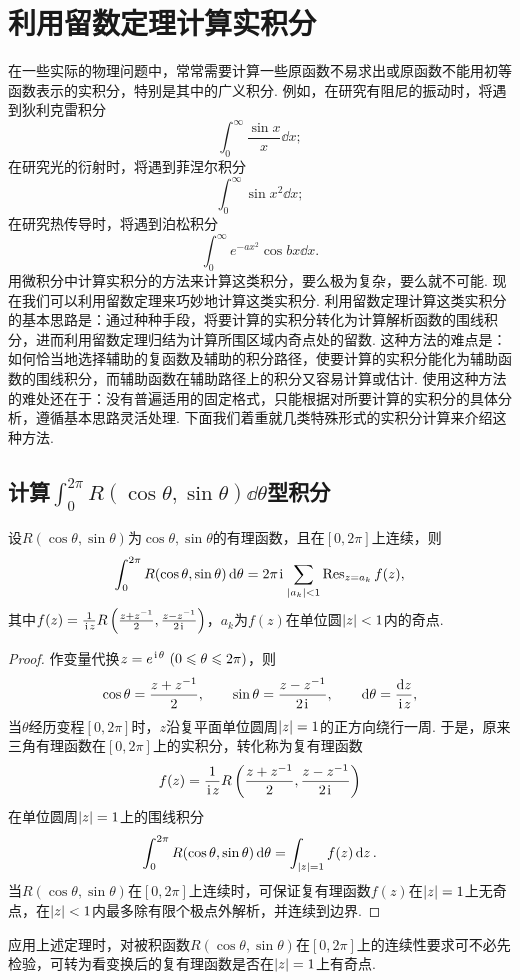 \section{利用留数定理计算实积分}
在一些实际的物理问题中，常常需要计算一些原函数不易求出或原函数不能用初等函数表示的实积分，特别是其中的广义积分.
例如，在研究有阻尼的振动时，将遇到狄利克雷积分\[
\int_0^{\infty} \frac{\sin x}{x} \dd{x};
\]在研究光的衍射时，将遇到菲涅尔积分\[
\int_0^{\infty} \sin x^2 \dd{x};
\]在研究热传导时，将遇到泊松积分\[
\int_0^{\infty} e^{-ax^2} \cos bx \dd{x}.
\]用微积分中计算实积分的方法来计算这类积分，要么极为复杂，要么就不可能.
现在我们可以利用留数定理来巧妙地计算这类实积分.
利用留数定理计算这类实积分的基本思路是：通过种种手段，将要计算的实积分转化为计算解析函数的围线积分，进而利用留数定理归结为计算所围区域内奇点处的留数.
这种方法的难点是：如何恰当地选择辅助的复函数及辅助的积分路径，使要计算的实积分能化为辅助函数的围线积分，而辅助函数在辅助路径上的积分又容易计算或估计.
使用这种方法的难处还在于：没有普遍适用的固定格式，只能根据对所要计算的实积分的具体分析，遵循基本思路灵活处理.
下面我们着重就几类特殊形式的实积分计算来介绍这种方法.

\subsection{计算\texorpdfstring{\(\int_0^{2\pi} R(\cos\theta,\sin\theta) \dd{\theta}\)型}{在[0,2π]区间上的含有三角函数的}积分}
\begin{theorem}\label{theorem:留数定理.利用留数定理计算实积分1}
设\(R(\cos\theta,\sin\theta)\)为\(\cos\theta,\sin\theta\)的有理函数，且在\([0,2\pi]\)上连续，则\[
\int_0^{2\pi} R(\cos\theta,\sin\theta) \dd{\theta}
= 2\pi\kern1pt\mathrm{i}\kern1pt \sum\limits_{\abs{a_k}<1} \operatorname{Res}_{z=a_k} f(z),
\]其中\(f(z) = \frac{1}{\kern1pt\mathrm{i}\kern1pt z} R\left(\frac{z+z^{-1}}{2},\frac{z-z^{-1}}{2\kern1pt\mathrm{i}\kern1pt}\right)\)，\(a_k\)为\(f(z)\)在单位圆\(\abs{z}<1\)内的奇点.
\begin{proof}
作变量代换\(z = e^{\kern1pt\mathrm{i}\kern1pt\theta}\ (0\leqslant\theta\leqslant2\pi)\)，则\[
\cos\theta = \frac{z+z^{-1}}{2},
\qquad
\sin\theta = \frac{z-z^{-1}}{2\kern1pt\mathrm{i}\kern1pt},
\qquad
\dd{\theta} = \frac{\dd{z}}{\kern1pt\mathrm{i}\kern1pt z},
\]当\(\theta\)经历变程\([0,2\pi]\)时，\(z\)沿复平面单位圆周\(\abs{z}=1\)的正方向绕行一周.
于是，原来三角有理函数在\([0,2\pi]\)上的实积分，转化称为复有理函数\[
f(z) = \frac{1}{\kern1pt\mathrm{i}\kern1pt z} R\left(\frac{z+z^{-1}}{2},\frac{z-z^{-1}}{2\kern1pt\mathrm{i}\kern1pt}\right)
\]在单位圆周\(\abs{z}=1\)上的围线积分\[
\int_0^{2\pi} R(\cos\theta,\sin\theta) \dd{\theta}
= \int_{\abs{z}=1} f(z) \dd{z}.
\]当\(R(\cos\theta,\sin\theta)\)在\([0,2\pi]\)上连续时，可保证复有理函数\(f(z)\)在\(\abs{z}=1\)上无奇点，在\(\abs{z}<1\)内最多除有限个极点外解析，并连续到边界.
\end{proof}
\end{theorem}
应用上述定理时，对被积函数\(R(\cos\theta,\sin\theta)\)在\([0,2\pi]\)上的连续性要求可不必先检验，可转为看变换后的复有理函数是否在\(\abs{z}=1\)上有奇点.

